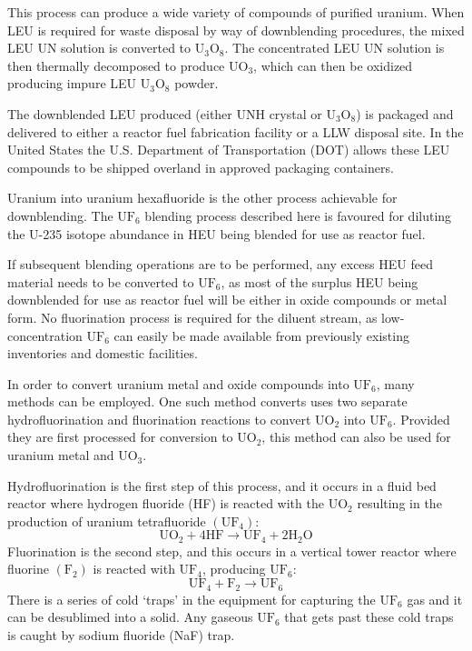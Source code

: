 \documentclass[twocolumn,a4paper]{article}
\begin{document}
This process can produce a wide variety of compounds of purified uranium. When LEU is 
required for waste disposal by way of downblending procedures, the mixed LEU UN solution 
is converted to \(\mathrm{U_3O_8}\). The concentrated LEU UN solution is then thermally decomposed to 
produce \(\mathrm{UO_3}\), which can then be oxidized producing impure LEU \(\mathrm{U_3O_8}\) powder.

The downblended LEU produced (either UNH crystal or \(\mathrm{U_3O_8}\)) is packaged and delivered 
to either a reactor fuel fabrication facility or a LLW disposal site. In the United 
States the U.S. Department of Transportation (DOT) allows these LEU compounds to be 
shipped overland in approved packaging containers.

Uranium into uranium hexafluoride is the other process achievable for downblending. 
The \(\mathrm{UF_6}\) blending process described here is favoured for diluting the U-235 isotope 
abundance in HEU being blended for use as reactor fuel.

If subsequent blending operations are to be performed, any excess HEU feed material 
needs to be converted to \(\mathrm{UF_6}\), as most of the surplus HEU being downblended for use 
as reactor fuel will be either in oxide compounds or metal form. No fluorination 
process is required for the diluent stream, as low-concentration \(\mathrm{UF_6}\) can easily 
be made available from previously existing inventories and domestic facilities.

In order to convert uranium metal and oxide compounds into \(\mathrm{UF_6}\), many methods can 
be employed. One such method converts uses two separate hydrofluorination and 
fluorination reactions to convert \(\mathrm{UO_2}\) into \(\mathrm{UF_6}\). Provided they are first processed 
for conversion to \(\mathrm{UO_2}\), this method can also be used for uranium metal and \(\mathrm{UO_3}\).

Hydrofluorination is the first step of this process, and it occurs in a fluid bed 
reactor where hydrogen fluoride (HF) is reacted with the \(\mathrm{UO_2}\) resulting in the 
production of uranium tetrafluoride \(\mathrm{(UF_4)}\):
\[ \mathrm{ UO_2 + 4HF \rightarrow UF_4 + 2 H_2O } \]
Fluorination is the second step, and this occurs in a vertical tower reactor where 
fluorine \(\mathrm{(F_2)}\) is reacted with \(\mathrm{UF_4}\), producing \(\mathrm{UF_6}\): 
\[ \mathrm{ UF_4 + F_2 \rightarrow UF_6 } \]
There is a series of cold `traps' in the equipment for capturing the \(\mathrm{UF_6}\) gas and it 
can be desublimed into a solid. Any gaseous \(\mathrm{UF_6}\) that gets past these cold traps is 
caught by sodium fluoride (NaF) trap.
\end{document}
